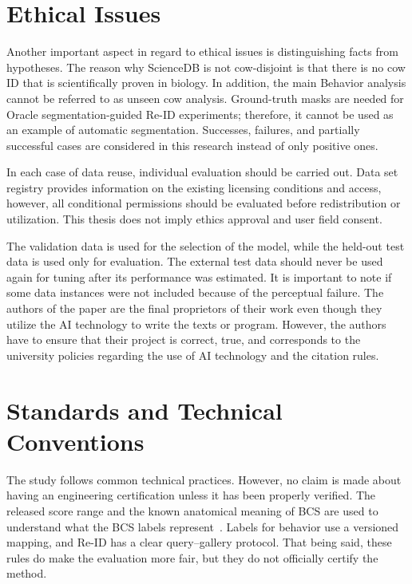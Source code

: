 \section{Ethical Issues}

Another important aspect in regard to ethical issues is distinguishing facts from hypotheses. The reason why ScienceDB is not cow-disjoint is that there is no cow ID that is scientifically proven in biology. In addition, the main Behavior analysis cannot be referred to as unseen cow analysis. Ground-truth masks are needed for Oracle segmentation-guided Re-ID experiments; therefore, it cannot be used as an example of automatic segmentation. Successes, failures, and partially successful cases are considered in this research instead of only positive ones.

In each case of data reuse, individual evaluation should be carried out. Data set registry provides information on the existing licensing conditions and access, however, all conditional permissions should be evaluated before redistribution or utilization. This thesis does not imply ethics approval and user field consent.

The validation data is used for the selection of the model, while the held-out test data is used only for evaluation. The external test data should never be used again for tuning after its performance was estimated. It is important to note if some data instances were not included because of the perceptual failure. The authors of the paper are the final proprietors of their work even though they utilize the AI technology to write the texts or program. However, the authors have to ensure that their project is correct, true, and corresponds to the university policies regarding the use of AI technology and the citation rules.

\section{Standards and Technical Conventions}

The study follows common technical practices. However, no claim is made about having an engineering certification unless it has been properly verified. The released score range and the known anatomical meaning of BCS are used to understand what the BCS labels represent~\cite{edmonson1989bcs,ferguson1994bcs}. Labels for behavior use a versioned mapping, and Re-ID has a clear query--gallery protocol. That being said, these rules do make the evaluation more fair, but they do not officially certify the method.

